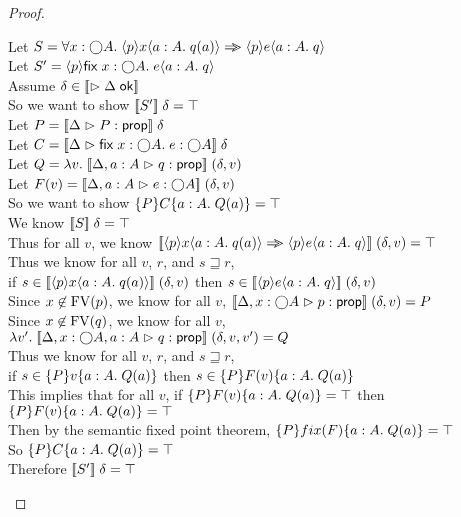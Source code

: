 \begin{proof}
  \begin{tabbedproof}
    \oo Let $S = \forall x:\monad{A}.\; \mspec{p}x{a:A}{q(a)} \specimp \mspec{p}{e}{a:A}{q}$\\
    \oo Let $S' = \mspec{p}{\fix{x:\monad{A}}{e}}{a:A}{q}$ \\
    \oo Assume $\delta \in \interp{\judgeACtx{\Delta}}$ \\
    \ooo So we want to show $\interp{S'}\;\delta = \top$ \\
    \ooo Let $P = \interp{\judgeA{P}{\assert}}\;\delta$ \\
    \ooo Let $C = \interp{\judgeA{\fix{x:\monad{A}}{e}}{\monad{A}}}\;\delta$ \\
    \ooo Let $Q = \semfun{v}{\interp{\judgeA[\Delta,a:A]{q}{\assert}}\;(\delta,v)}$ \\
    \ooo Let $F(v) = \interp{\judgeA[\Delta,a:A]{e}{\monad{A}}}\;(\delta,v)$ \\
    \ooo So we want to show $\spec{P}{C}{a:A}{Q(a)} = \top$ \\
    \ooo We know $\interp{S}\;\delta = \top$ \\
    \ooo Thus for all $v$, we know $\interp{\mspec{p}x{a:A}{q(a)} \specimp \mspec{p}{e}{a:A}{q}}\;(\delta,v) = \top$ \\
    \ooo Thus we know for all $v$, $r$, and $s \sqsupseteq r$, \\
    \ooox if $s \in \interp{\mspec{p}x{a:A}{q(a)}}\;(\delta,v)$ then $s \in \interp{\mspec{p}{e}{a:A}{q}}\;(\delta,v)$ \\
    \ooo Since $x \not\in \FV{p}$, we know for all $v$, 
         $\interp{\judgeA[\Delta,x:\monad{A}]{p}{\assert}}\;(\delta,v) = P$ \\
    \ooo Since $x \not\in \FV{q}$, we know for all $v$, 
         $\semfun{v'}{\interp{\judgeA[\Delta,x:\monad{A}, a:A]{q}{\assert}}\;(\delta,v,v')} = Q$ \\
    \ooo Thus we know for all $v$, $r$, and $s \sqsupseteq r$, \\
    \ooox if $s \in  \spec{P}{v}{a:A}{Q(a)}$ then 
             $s \in \spec{P}{F(v)}{a:A}{Q(a)}$ \\
    \ooo This implies that for all $v$, if $\spec{P}{F(v)}{a:A}{Q(a)} = \top $ 
                                        then $\spec{P}{F(v)}{a:A}{Q(a)} = \top$ \\
    \ooo Then by the semantic fixed point theorem, 
          $\spec{P}{fix(F)}{a:A}{Q(a)} = \top$ \\
    \ooo So $\spec{P}{C}{a:A}{Q(a)} = \top$ \\
    \ooo Therefore $\interp{S'}\;\delta = \top$ \\
  \end{tabbedproof}
\end{proof}

